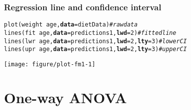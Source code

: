 \documentclass[color=usenames,dvipsnames]{beamer}\usepackage[]{graphicx}\usepackage[]{color}
\makeatletter
\newcommand{\hlnum}[1]{\textcolor[rgb]{0.69,0.494,0}{#1}}%
\newcommand{\hlcom}[1]{\textcolor[rgb]{0.514,0.506,0.514}{\textit{#1}}}%
\newcommand{\hlopt}[1]{\textcolor[rgb]{0,0,0}{#1}}%
\newcommand{\hlstd}[1]{\textcolor[rgb]{0,0,0}{#1}}%
\newcommand{\hlkwc}[1]{\textcolor[rgb]{0,0,0}{\textbf{#1}}}%
\newcommand{\hlkwd}[1]{\textcolor[rgb]{0.004,0.004,0.506}{#1}}%
\newenvironment{kframe}{%
 \def\at@end@of@kframe{}%
 \ifinner\ifhmode%
  \def\at@end@of@kframe{\end{minipage}}%
  \begin{minipage}{\columnwidth}%
 \fi\fi%
 \def\FrameCommand##1{\hskip\@totalleftmargin \hskip-\fboxsep
 \colorbox{shadecolor}{##1}\hskip-\fboxsep
     \hskip-\linewidth \hskip-\@totalleftmargin \hskip\columnwidth}%
 \MakeFramed {\advance\hsize-\width
   \@totalleftmargin\z@ \linewidth\hsize
   \@setminipage}}%
 {\par\unskip\endMakeFramed%
 \at@end@of@kframe}
\newenvironment{knitrout}{}{} %
\makeatother
\begin{document}
\begin{frame}[fragile]
  \frametitle{Regression line and confidence interval}
  \scriptsize
\begin{knitrout}\scriptsize
{}\color{fgcolor}\begin{kframe}
\begin{alltt}
\hlkwd{plot}\hlstd{(weight} \hlopt{~} \hlstd{age,} \hlkwc{data}\hlstd{=dietData)}                   \hlcom{# raw data}
\hlkwd{lines}\hlstd{(fit} \hlopt{~} \hlstd{age,} \hlkwc{data}\hlstd{=predictions1,} \hlkwc{lwd}\hlstd{=}\hlnum{2}\hlstd{)}        \hlcom{# fitted line}
\hlkwd{lines}\hlstd{(lwr} \hlopt{~} \hlstd{age,} \hlkwc{data}\hlstd{=predictions1,} \hlkwc{lwd}\hlstd{=}\hlnum{2}\hlstd{,} \hlkwc{lty}\hlstd{=}\hlnum{3}\hlstd{)} \hlcom{# lower CI}
\hlkwd{lines}\hlstd{(upr} \hlopt{~} \hlstd{age,} \hlkwc{data}\hlstd{=predictions1,} \hlkwc{lwd}\hlstd{=}\hlnum{2}\hlstd{,} \hlkwc{lty}\hlstd{=}\hlnum{3}\hlstd{)} \hlcom{# upper CI}
\end{alltt}
\end{kframe}
\end{knitrout}
  \vspace{-9mm}
  \begin{center}
    \texttt{[image: figure/plot-fm1-1]}
  \end{center}
\end{frame}



\section{One-way ANOVA}
\end{document}
